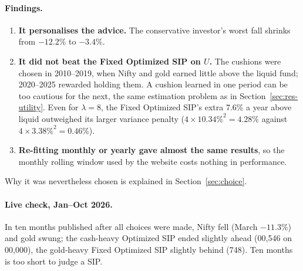 \paragraph{Findings.}
\begin{enumerate}
  \item \textbf{It personalises the advice.} The conservative investor's worst fall shrinks from
        $-12.2\%$ to $-3.4\%$.
  \item \textbf{It did not beat the Fixed Optimized SIP on $U$.} The cushions were chosen in
        2010--2019, when Nifty and gold earned little above the liquid fund; 2020--2025 rewarded
        holding them. A cushion learned in one period can be too cautious for the next, the same
        estimation problem as in Section~\ref{sec:res-utility}. Even for $\lambda = 8$, the Fixed
        Optimized SIP's extra 7.6\% a year above liquid outweighed its larger variance penalty
        ($4 \times 10.34\%^2 = 4.28\%$ against $4 \times 3.38\%^2 = 0.46\%$).
  \item \textbf{Re-fitting monthly or yearly gave almost the same results}, so the monthly rolling
        window used by the website costs nothing in performance.
\end{enumerate}

Why it was nevertheless chosen is explained in Section~\ref{sec:choice}.

\paragraph{Live check, Jan--Oct 2026.} In ten months published after all choices were made, Nifty fell (March $-11.3\%$) and gold swung; the cash-heavy Optimized SIP ended slightly ahead (00{,}546 on 00{,}000), the gold-heavy Fixed Optimized SIP slightly behind (748). Ten months is too short to judge a SIP.

